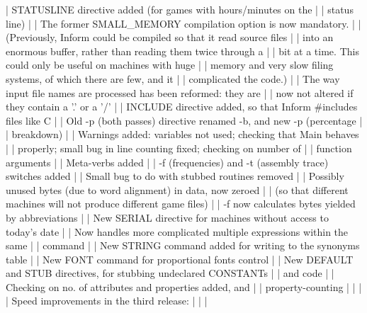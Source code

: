 |     STATUSLINE directive added (for games with hours/minutes on the       |
|       status line)                                                        |
|     The former SMALL_MEMORY compilation option is now mandatory.          |
|       (Previously, Inform could be compiled so that it read source files  |
|       into an enormous buffer, rather than reading them twice through a   |
|       bit at a time.  This could only be useful on machines with huge     |
|       memory and very slow filing systems, of which there are few, and it |
|       complicated the code.)                                              |
|     The way input file names are processed has been reformed: they are    |
|       now not altered if they contain a '.' or a '/'                      |
|     INCLUDE directive added, so that Inform #includes files like C        |
|     Old -p (both passes) directive renamed -b, and new -p (percentage     |
|       breakdown)                                                          |
|     Warnings added: variables not used; checking that Main behaves        |
|       properly; small bug in line counting fixed; checking on number of   |
|       function arguments                                                  |
|     Meta-verbs added                                                      |
|     -f (frequencies) and -t (assembly trace) switches added               |
|     Small bug to do with stubbed routines removed                         |
|     Possibly unused bytes (due to word alignment) in data, now zeroed     |
|       (so that different machines will not produce different game files)  |
|     -f now calculates bytes yielded by abbreviations                      |
|     New SERIAL directive for machines without access to today's date      |
|     Now handles more complicated multiple expressions within the same     |
|       command                                                             |
|     New STRING command added for writing to the synonyms table            |
|     New FONT command for proportional fonts control                       |
|     New DEFAULT and STUB directives, for stubbing undeclared CONSTANTs    |
|       and code                                                            |
|     Checking on no. of attributes and properties added, and               |
|       property-counting                                                   |
|                                                                           |
|   Speed improvements in the third release:                                |
|                                                                           |
